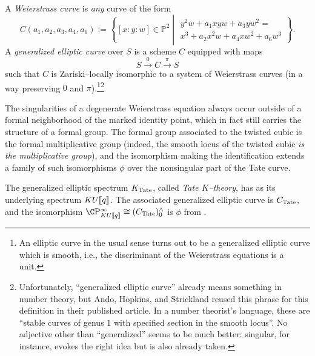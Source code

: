 \begin{definition}
A \textit{Weierstrass curve} is \emph{any} curve of the form \[C(a_1, a_2, a_3, a_4, a_6) := \left\{ [x : y : w] \in \mathbb P^2 \middle| \begin{array}{c} y^2 w + a_1 xyw + a_3 yw^2 = \\ x^3 + a_2 x^2 w + a_4 x w^2 + a_6 w^3 \end{array} \right\}.\]  A \textit{generalized elliptic curve} over $S$ is a scheme $C$ equipped with maps \[S \xrightarrow{0} C \xrightarrow{\pi} S\] such that $C$ is Zariski--locally isomorphic to a system of Weierstrass curves (in a way preserving $0$ and $\pi$).\footnote{An elliptic curve in the usual sense turns out to be a generalized elliptic curve which is smooth, i.e., the discriminant of the Weierstrass equations is a unit.}\footnote{Unfortunately, ``generalized elliptic curve'' already means something in number theory, but Ando, Hopkins, and Strickland reused this phrase for this definition in their published article.  In a number theorist's language, these are ``stable curves of genus $1$ with specified section in the smooth locus''.  No adjective other than ``generalized'' seems to be much better: singular, for instance, evokes the right idea but is also already taken.}
\end{definition}

\begin{remark}\label{TwistedCubicGivesGm}
The singularities of a degenerate Weierstrass equation always occur outside of a formal neighborhood of the marked identity point, which in fact still carries the structure of a formal group.  The formal group associated to the twisted cubic is the formal multiplicative group (indeed, the smooth locus of the twisted cubic \emph{is the multiplicative group}), and the isomorphism making the identification extends a family of such isomorphisms $\phi$ over the nonsingular part of the Tate curve.
\end{remark}

\begin{definition}
The generalized elliptic spectrum $K_{\mathrm{Tate}}$, called \textit{Tate $K$--theory}, has as its underlying spectrum $KU\llbracket{q}\rrbracket$.  The associated generalized elliptic curve is $C_{\mathrm{Tate}}$, and the isomorphism $\CP^\infty_{KU\ps{q}} \cong (C_{\Tate})^\wedge_0$ is $\phi$ from .
\end{definition}


